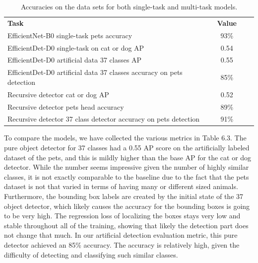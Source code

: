 \begin{table}[]
    \centering
    \begin{tabular}{lccl}
        \multicolumn{1}{l}{\textbf{Task}}    & \multicolumn{1}{l}{\textbf{Value}}  \\ \cline{1-2}
        \multicolumn{1}{l}{EfficientNet-B0 single-task pets accuracy} & \multicolumn{1}{c}{93\%}                    \\ \hline
        \multicolumn{1}{l}{EfficientDet-D0 single-task on cat or dog AP} & \multicolumn{1}{c}{0.54}                       \\ \hline
        \multicolumn{1}{l}{EfficientDet-D0 artificial data 37 classes AP} & \multicolumn{1}{c}{0.55}                       \\ \hline
        \multicolumn{1}{l}{EfficientDet-D0 artificial data 37 classes accuracy on pets detection} & \multicolumn{1}{c}{85\%}                    \\ \hline
        \multicolumn{1}{l}{Recursive detector cat or dog AP}       & \multicolumn{1}{c}{0.52}                    \\ \hline
        \multicolumn{1}{l}{Recursive detector pets head accuracy}       & \multicolumn{1}{c}{89\%}                       \\ \hline
        \multicolumn{1}{l}{Recursive detector 37 class detector accuracy on pets detection}       & \multicolumn{1}{c}{91\%}                       \\ \hline
    \end{tabular}
    \caption{Accuracies on the data sets for both single-task and multi-task models.}
\end{table}

To compare the models, we have collected the various metrics in Table 6.3. 
The pure object detector for 37 classes had a 0.55 AP score on the artificially labeled dataset of the pets, and this is mildly higher than the base AP for the cat or dog detector.
While the number seems impressive given the number of highly similar classes, it is not exactly comparable to the baseline due to the fact that the pets dataset is not that varied in terms of having many or different sized animals.
Furthermore, the bounding box labels are created by the initial state of the 37 object detector, which likely causes the accuracy for the bounding boxes is going to be very high.
The regression loss of localizing the boxes stays very low and stable throughout all of the training, showing that likely the detection part does not change that much.
In our artificial detection evaluation metric, this pure detector achieved an 85\% accuracy.
The accuracy is relatively high, given the difficulty of detecting and classifying such similar classes.

